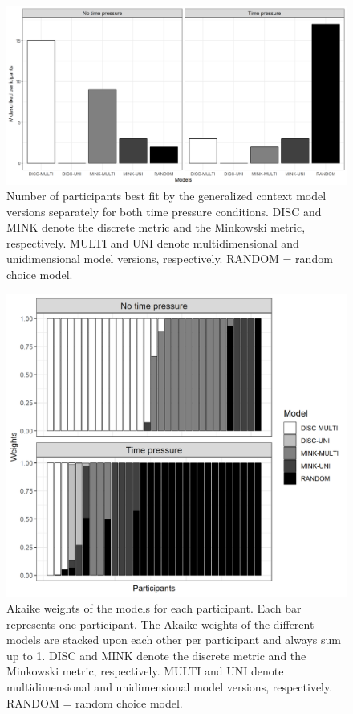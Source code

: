 \documentclass[a4paper,man,natbib]{apa6}
\begin{document}
\begin{figure}[htbp]
\centering
\includegraphics[width = \textwidth]{fig_model_selection.png}
\caption{Number of participants best fit by the generalized context model versions separately for both time pressure conditions. DISC and MINK denote the discrete metric and the Minkowski metric, respectively. MULTI and UNI denote multidimensional and unidimensional model versions, respectively. RANDOM = random choice model.}
\label{fig:model_selection}
\end{figure}

\begin{figure}[htbp]
\centering
\includegraphics[width = \textwidth]{fig_aic.png}
\caption{Akaike weights of the models for each participant. Each bar represents one participant. The Akaike weights of the different models are stacked upon each other per participant and always sum up to 1. DISC and MINK denote the discrete metric and the Minkowski metric, respectively. MULTI and UNI denote multidimensional and unidimensional model versions, respectively. RANDOM = random choice model.}
\label{fig:aic}
\end{figure}
\end{document}

